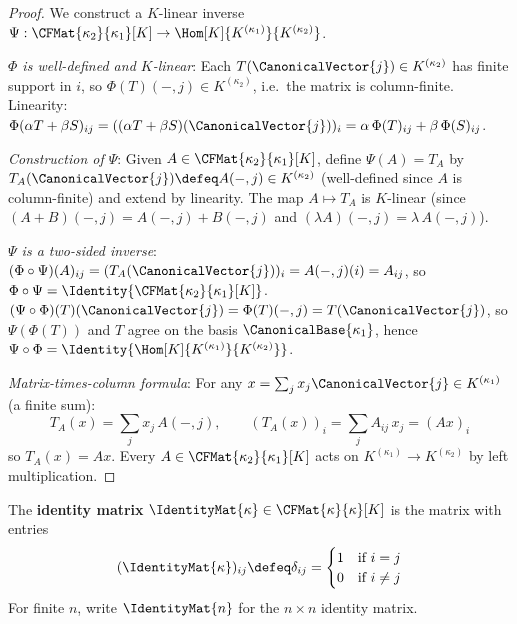 \begin{proof}
    We construct a $K$-linear inverse $\Psi: \CFMat{\kappa_2}{\kappa_1}[K] \to
    \Hom[K]{K^{(\kappa_1)}}{K^{(\kappa_2)}}$.

    \textit{$\Phi$ is well-defined and $K$-linear}:
    Each $T(\CanonicalVector{j}) \in K^{(\kappa_2)}$ has finite support in $i$, so
    $\Phi(T)(-,j) \in K^{(\kappa_2)}$, i.e.\ the matrix is column-finite. Linearity:
    $\Phi(\alpha T + \beta S)_{ij}
    = ((\alpha T + \beta S)(\CanonicalVector{j}))_i
    = \alpha\, \Phi(T)_{ij} + \beta\, \Phi(S)_{ij}$.

    \textit{Construction of $\Psi$}:
    Given $A \in \CFMat{\kappa_2}{\kappa_1}[K]$, define $\Psi(A) = T_A$ by
    $T_A(\CanonicalVector{j}) \defeq A(-,j) \in K^{(\kappa_2)}$ (well-defined since $A$ is
    column-finite) and extend by linearity. The map $A \mapsto T_A$ is $K$-linear
    (since $(A + B)(-,j) = A(-,j) + B(-,j)$ and $(\lambda A)(-,j) = \lambda\, A(-,j)$).

    \textit{$\Psi$ is a two-sided inverse}:
    $(\Phi \circ \Psi)(A)_{ij} = (T_A(\CanonicalVector{j}))_i = A(-,j)(i) = A_{ij}$,
    so $\Phi \circ \Psi = \Identity{\CFMat{\kappa_2}{\kappa_1}[K]}$.
    $(\Psi \circ \Phi)(T)(\CanonicalVector{j}) = \Phi(T)(-,j) = T(\CanonicalVector{j})$,
    so $\Psi(\Phi(T))$ and $T$ agree on the basis $\CanonicalBase{\kappa_1}$, hence
    $\Psi \circ \Phi = \Identity{\Hom[K]{K^{(\kappa_1)}}{K^{(\kappa_2)}}}$.

    \textit{Matrix-times-column formula}:
    For any $x = \sum_j x_j \CanonicalVector{j} \in K^{(\kappa_1)}$ (a finite sum):
    \[
        T_A(x) = \sum_j x_j\, A(-,j), \qquad
        (T_A(x))_i = \sum_j A_{ij}\, x_j = (Ax)_i
    \]
    so $T_A(x) = Ax$. Every $A \in \CFMat{\kappa_2}{\kappa_1}[K]$ acts on
    $K^{(\kappa_1)} \to K^{(\kappa_2)}$ by left multiplication.
\end{proof}

\begin{definition}
\label{def:identity-matrix}
    The \textbf{identity matrix} $\IdentityMat{\kappa} \in \CFMat{\kappa}{\kappa}[K]$ is
    the matrix with entries
    \[
        (\IdentityMat{\kappa})_{ij} \defeq \delta_{ij}
        = \begin{cases} 1 & \text{if } i = j \\ 0 & \text{if } i \neq j \end{cases}
    \]
    For finite $n$, write $\IdentityMat{n}$ for the $n \times n$ identity matrix.
\end{definition}


